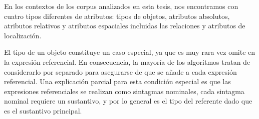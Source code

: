 En los contextos de los corpus analizados en esta tesis, nos encontramos con cuatro tipos diferentes de atributos:
tipos de objetos, atributos absolutos, atributos relativos y atributos espaciales incluidas las relaciones y atributos de localizaci\'on.

El tipo de un objeto constituye un caso especial, ya que es muy rara vez omite
en la expresi\'on referencial. En consecuencia, la mayor\'ia de los algoritmos tratan de
considerarlo por separado para asegurarse de que se a\~nade a cada expresi\'on referencial. Una explicaci\'on parcial para esta condici\'on especial es que las expresiones referenciales se realizan como sintagmas nominales,
cada sintagma nominal requiere un sustantivo, y por lo general es el tipo del referente dado que es el sustantivo principal.

